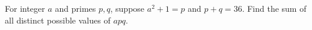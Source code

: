 For integer $a$ and primes $p,q$, suppose $a^2+1=p$ and $p+q=36$. Find the sum of all distinct possible values of $apq$.
